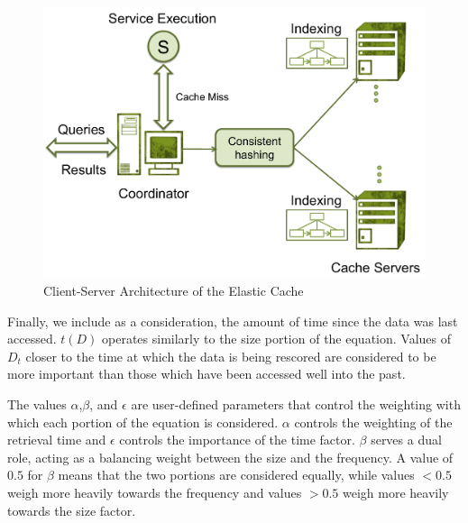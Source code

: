\begin{figure}
\begin{center}
\includegraphics[scale=0.5]{figures/arch.pdf}
\end{center}
\caption{Client-Server Architecture of the Elastic Cache}
\label{fig:architecture2}
\end{figure}

Finally, we include as a consideration, the amount of time since the data was
last accessed. $t(D)$ operates similarly to the size portion of the equation.
Values of $D_t$ closer to the time at which the data is being rescored are
considered to be more important than those which have been accessed well into
the past.

The values $\alpha$,$\beta$, and $\epsilon$ are user-defined parameters that
control the weighting with which each portion of the equation is considered.
$\alpha$ controls the weighting of the retrieval time and $\epsilon$ controls
the importance of the time factor. $\beta$ serves a dual role, acting as a
balancing weight between the size and the frequency. A value of $0.5$ for
$\beta$ means that the two portions are considered equally, while values $<
0.5$ weigh more heavily towards the frequency and values $> 0.5$ weigh more
heavily towards the size factor.



